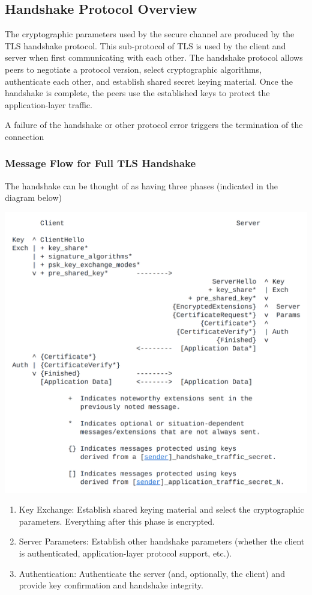 \documentclass{article}
\begin{document}
\subsection{Handshake Protocol Overview}
The cryptographic parameters used by the secure channel are produced
by the TLS handshake protocol.  This sub-protocol of TLS is used by
the client and server when first communicating with each other.  The
handshake protocol allows peers to negotiate a protocol version,
select cryptographic algorithms, authenticate each other,
and establish shared secret keying material.  Once the handshake is
complete, the peers use the established keys to protect the
application-layer traffic.

A failure of the handshake or other protocol error triggers the
termination of the connection

\subsubsection{Message Flow for Full TLS Handshake}
The handshake can be thought of as having three phases (indicated in the diagram below)
\begin{center}
    \includegraphics[width=1.1\columnwidth]{media/overview.png}
\end{center}


\begin{enumerate}
    \item Key Exchange: Establish shared keying material and select the
          cryptographic parameters.  Everything after this phase is
          encrypted.
    \item Server Parameters: Establish other handshake parameters
          (whether the client is authenticated, application-layer protocol
          support, etc.).
    \item Authentication: Authenticate the server (and, optionally, the
          client) and provide key confirmation and handshake integrity.
\end{enumerate}
\end{document}
